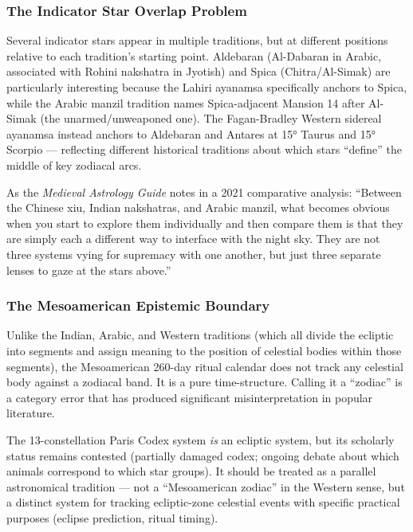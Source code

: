 \documentclass[11pt,letterpaper]{article}
\begin{document}
\subsubsection{The Indicator Star Overlap Problem}

Several indicator stars appear in multiple traditions, but at different positions relative to each tradition's starting point. Aldebaran (Al-Dabaran in Arabic, associated with Rohini nakshatra in Jyotish) and Spica (Chitra/Al-Simak) are particularly interesting because the Lahiri ayanamsa specifically anchors to Spica, while the Arabic manzil tradition names Spica-adjacent Mansion 14 after Al-Simak (the unarmed/unweaponed one). The Fagan-Bradley Western sidereal ayanamsa instead anchors to Aldebaran and Antares at 15° Taurus and 15° Scorpio --- reflecting different historical traditions about which stars ``define'' the middle of key zodiacal arcs.

As the \textit{Medieval Astrology Guide} notes in a 2021 comparative analysis: ``Between the Chinese xiu, Indian nakshatras, and Arabic manzil, what becomes obvious when you start to explore them individually and then compare them is that they are simply each a different way to interface with the night sky. They are not three systems vying for supremacy with one another, but just three separate lenses to gaze at the stars above.''

\subsubsection{The Mesoamerican Epistemic Boundary}

Unlike the Indian, Arabic, and Western traditions (which all divide the ecliptic into segments and assign meaning to the position of celestial bodies within those segments), the Mesoamerican 260-day ritual calendar does not track any celestial body against a zodiacal band. It is a pure time-structure. Calling it a ``zodiac'' is a category error that has produced significant misinterpretation in popular literature.

The 13-constellation Paris Codex system \textit{is} an ecliptic system, but its scholarly status remains contested (partially damaged codex; ongoing debate about which animals correspond to which star groups). It should be treated as a parallel astronomical tradition --- not a ``Mesoamerican zodiac'' in the Western sense, but a distinct system for tracking ecliptic-zone celestial events with specific practical purposes (eclipse prediction, ritual timing).
\end{document}
